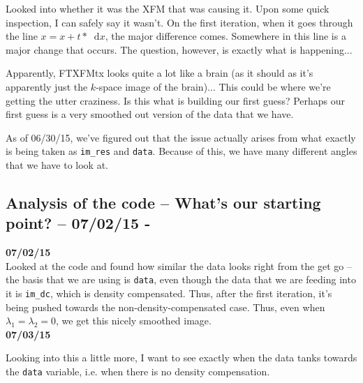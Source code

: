 \documentclass[11 pt]{article}
\newcommand*\diff{\mathop{}\!\mathrm{d}}
\newcommand{\bo}{\noindent\textbf}
\begin{document}
    Looked into whether it was the XFM that was causing it. Upon some quick inspection, I can safely say it wasn't. On the first iteration, when it goes through the line $x = x + t*\diff x$, the major difference comes. Somewhere in this line is a major change that occurs. The question, however, is exactly what is happening... 

    Apparently, FTXFMtx looks quite a lot like a brain (as it should as it's apparently just the $k$-space image of the brain)... This could be where we're getting the utter craziness. Is this what is building our first guess? Perhaps our first guess is a very smoothed out version of the data that we have. 

    As of 06/30/15, we've figured out that the issue actually arises from what exactly is being taken as \texttt{im\_res} and \texttt{data}. Because of this, we have many different angles that we have to look at.


  \subsection{Analysis of the code -- What's our starting point? -- 07/02/15 - }

    \bo{07/02/15}\\

    Looked at the code and found how similar the data looks right from the get go -- the basis that we are using is \texttt{data}, even though the data that we are feeding into it is \texttt{im\_dc}, which is density compensated. Thus, after the first iteration, it's being pushed towards the non-density-compensated case. Thus, even when $\lambda_1 = \lambda_2 = 0$, we get this nicely smoothed image. \\

    \bo{07/03/15}
    
    Looking into this a little more, I want to see exactly when the data tanks towards the \texttt{data} variable, i.e. when there is no density compensation. 
    
\end{document}
